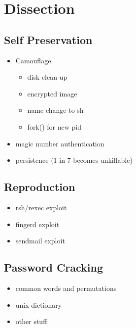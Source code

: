 \section*{Dissection}


\subsection*{Self Preservation}
    	\begin{itemize}
        	\item Camouflage
            	\begin{itemize}
        		\item disk clean up
                \item encrypted image
                \item name change to sh
                \item fork() for new pid
            	\end{itemize}
            \item magic number authentication
            \item persistence (1 in 7 becomes unkillable)
        \end{itemize}

\subsection*{Reproduction}
		\begin{itemize}
		\item rsh/rexec exploit
 	    \item fingerd exploit
 	    \item sendmail exploit
		\end{itemize}

\subsection*{Password Cracking}
    	\begin{itemize}
    	\item common words and permutations
        \item unix dictionary
        \item other stuff
    	\end{itemize}

